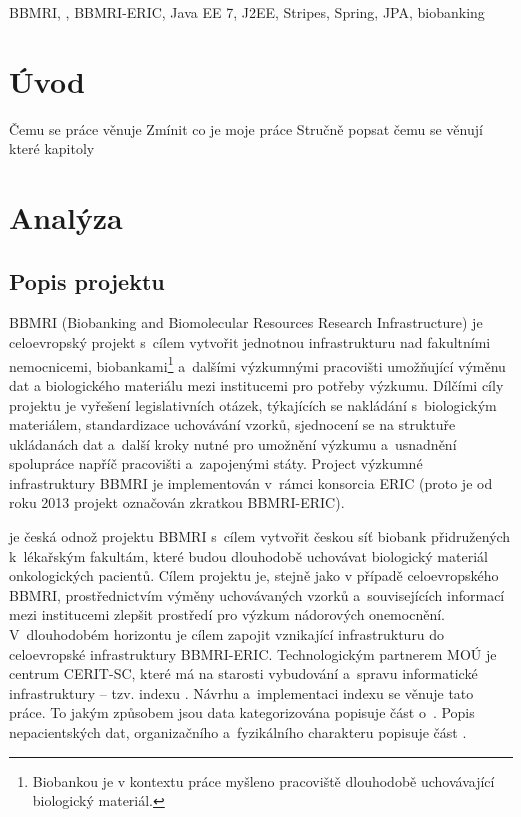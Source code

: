 \begin{ThesisAbstract}
\end{ThesisAbstract}

\begin{ThesisKeyWords}
BBMRI, \ProjectName, BBMRI-ERIC, Java EE 7, J2EE, Stripes, Spring, JPA, biobanking

\end{ThesisKeyWords}

\MainMatter

\tableofcontents

\chapter{Úvod}
Čemu se práce věnuje
Zmínit co je moje práce
Stručně popsat čemu se věnují které kapitoly

\chapter{Analýza}

\section{Popis projektu \ProjectName}
BBMRI (Biobanking and Biomolecular Resources Research Infrastructure) je celoevropský projekt s~cílem vytvořit jednotnou infrastrukturu nad fakultními nemocnicemi, biobankami\footnote{Biobankou je v kontextu práce myšleno pracoviště dlouhodobě uchovávající biologický materiál.} a~dalšími výzkumnými pracovišti umožňující výměnu dat a biologického materiálu mezi institucemi pro potřeby výzkumu. Dílčími cíly projektu je vyřešení legislativních otázek, týkajících se nakládání s~biologickým materiálem, standardizace uchovávání vzorků, sjednocení se na struktuře ukládanách dat a~další kroky nutné pro umožnění výzkumu a~usnadnění spolupráce napříč pracovišti a~zapojenými státy. Project výzkumné infrastruktury BBMRI je implementován v~rámci konsorcia ERIC (proto je od roku 2013 projekt označován zkratkou BBMRI-ERIC).

\ProjectName je česká odnož projektu BBMRI s~cílem vytvořit českou síť biobank přidružených k~lékařským fakultám, které budou dlouhodobě uchovávat biologický materiál onkologických pacientů. Cílem projektu je, stejně jako v případě celoevropského BBMRI, prostřednictvím výměny uchovávaných vzorků a~souvisejících informací mezi institucemi zlepšit prostředí pro výzkum nádorových onemocnění. V~dlouhodobém horizontu je cílem zapojit vznikající infrastrukturu \ProjectName do celoevropské infrastruktury BBMRI-ERIC. Technologickým partnerem MOÚ je centrum CERIT-SC, které má na starosti vybudování a~spravu informatické infrastruktury – tzv. indexu \ProjectName. Návrhu a~implementaci indexu \ProjectName se věnuje tato práce.	To jakým způsobem jsou data kategorizována popisuje část o~. Popis nepacientských dat, organizačního a~fyzikálního charakteru popisuje část .

